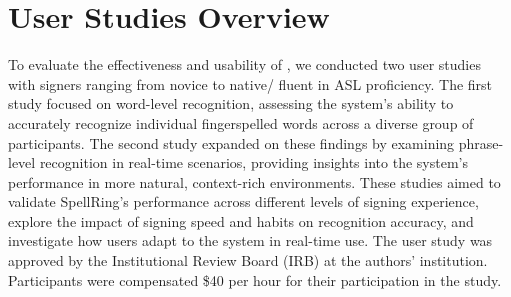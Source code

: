 \section{User Studies Overview}
To evaluate the effectiveness and usability of \theDevice, we conducted two user studies with signers ranging from novice to native/ fluent in ASL proficiency. The first study focused on word-level recognition, assessing the system's ability to accurately recognize individual fingerspelled words across a diverse group of participants. The second study expanded on these findings by examining phrase-level recognition in real-time scenarios, providing insights into the system's performance in more natural, context-rich environments. These studies aimed to validate SpellRing's performance across different levels of signing experience, explore the impact of signing speed and habits on recognition accuracy, and investigate how users adapt to the system in real-time use. The user study was approved by the Institutional Review Board (IRB) at the authors' institution. Participants were compensated \$40 per hour for their participation in the study.
